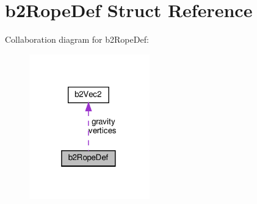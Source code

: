\hypertarget{structb2RopeDef}{}\section{b2\+Rope\+Def Struct Reference}
\label{structb2RopeDef}


Collaboration diagram for b2\+Rope\+Def\+:
\nopagebreak
\begin{figure}[H]
\begin{center}
\leavevmode
\includegraphics[width=148pt]{structb2RopeDef__coll__graph}
\end{center}
\end{figure}
